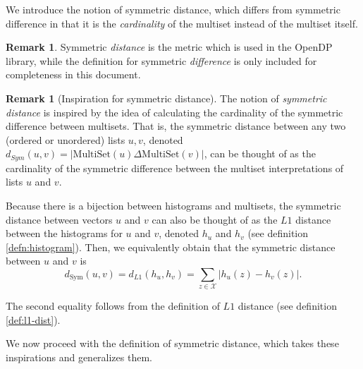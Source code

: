 \documentclass[11pt,a4paper]{article}
\theoremstyle{definition}
\newtheorem{remark}[theorem]{Remark}
\newtheorem{definition}[theorem]{Definition}
\newcommand{\MultiSet}{\mathrm{MultiSet}}
\begin{document}
We introduce the notion of symmetric distance, which differs from symmetric difference in that it is the \emph{cardinality} of the multiset instead of the multiset itself.

\begin{remark}
    Symmetric \emph{distance} is the metric which is used in the OpenDP library, while the definition for symmetric \emph{difference} is only included for completeness in this document.
\end{remark}

\begin{remark}[Inspiration for symmetric distance]
    The notion of \emph{symmetric distance} is inspired by the idea of calculating the cardinality of the symmetric difference between multisets. That is, the symmetric distance between any two (ordered or unordered) lists $u, v$, denoted $d_{Sym}(u,v) = |\MultiSet(u) \Delta \MultiSet(v)|$, can be thought of as the cardinality of the symmetric difference between the multiset interpretations of lists $u$ and $v$. 
    
    Because there is a bijection between histograms and multisets, the symmetric distance between vectors $u$ and $v$ can also be thought of as the $L1$ distance between the histograms for $u$ and $v$, denoted $h_u$ and $h_v$ (see definition \ref{defn:histogram}). Then, we equivalently obtain that the symmetric distance between $u$ and $v$ is
    $$d_{\text{Sym}}(u,v) = d_{L1}(h_{u}, h_{v}) = \sum_{z\in \mathcal{X}} |h_u(z) - h_{v}(z)|.$$
    
    The second equality follows from the definition of $L1$ distance (see definition \ref{def:l1-dist}).
    
    We now proceed with the definition of symmetric distance, which takes these inspirations and generalizes them.
\end{remark}


\end{document}
